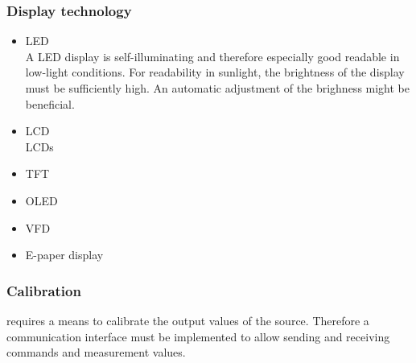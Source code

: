 \subsubsection{Display technology}
\begin{itemize}
     \item \acs{LED}
        \\
        A \ac{LED} display is self-illuminating and therefore especially good readable in low-light conditions. For readability in sunlight, the brightness of the display must be sufficiently high. An automatic adjustment of the brighness might be beneficial. 
    \item \acs{LCD}
        \\
        \acp{LCD}
    \item \acs{TFT}
        \\
    \item \acs{OLED}
        \\
    \item \acs{VFD}
        \\
    \item E-paper display
        \\
\end{itemize}

\subsubsection{Calibration}
 requires a means to calibrate the output values of the source. Therefore a communication interface must be implemented to allow sending and receiving commands and measurement values. 

